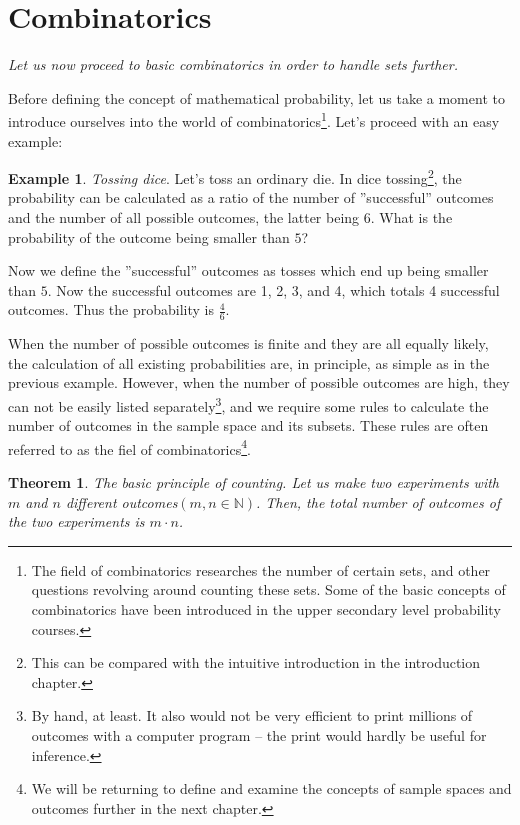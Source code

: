 \documentclass[12pt,a4paper,leqno]{report}
\theoremstyle{plain}
\newtheorem{lause}[equation]{Theorem}
\theoremstyle{definition}
\newtheorem{esim}[equation]{Example}
\begin{document}
\section{Combinatorics}\label{komb}

\emph{Let us now proceed to basic combinatorics in order to handle sets further.}

Before defining the concept of mathematical probability, let us take a moment to introduce ourselves into the world of combinatorics\footnote{The field of combinatorics researches the number of certain sets, and other questions revolving around counting these sets. Some of the basic concepts of combinatorics have been introduced in the upper secondary level probability courses.}. Let's proceed with an easy example: 

\begin{esim}\label{esim:dice}
\emph{Tossing dice}. Let's toss an ordinary die. In dice tossing\footnote{This can be compared with the intuitive introduction in the introduction chapter.}, the probability can be calculated as a ratio of the number of ''successful'' outcomes and the number of all possible outcomes, the latter being $6$. What is the probability of the outcome being smaller than $5$?

Now we define the ''successful'' outcomes as tosses which end up being smaller than $5$. Now the successful outcomes are 1, 2, 3, and 4, which totals 4 successful outcomes. Thus the probability is $\frac{4}{6}$.
\end{esim}

When the number of possible outcomes is finite and they are all equally likely, the calculation of all existing probabilities are, in principle, as simple as in the previous example. However, when the number of possible  outcomes are high, they can not be easily listed separately\footnote{By hand, at least. It also would not be very efficient to print millions of outcomes with a computer program -- the print would hardly be useful for inference.}, and we require some rules to calculate the number of outcomes in the sample space and its subsets. These rules are often referred to as the fiel of combinatorics\footnote{We will be returning to define and examine the concepts of sample spaces and outcomes further in the next chapter.}.

\begin{lause}\label{Basic Principle of Counting} The basic principle of counting. Let us make two experiments with $m$ and $n$ different outcomes$(m,n\in\mathbb{N})$. Then, the total number of outcomes of the two experiments is $m\cdot n$.
\end{lause}
\end{document}
